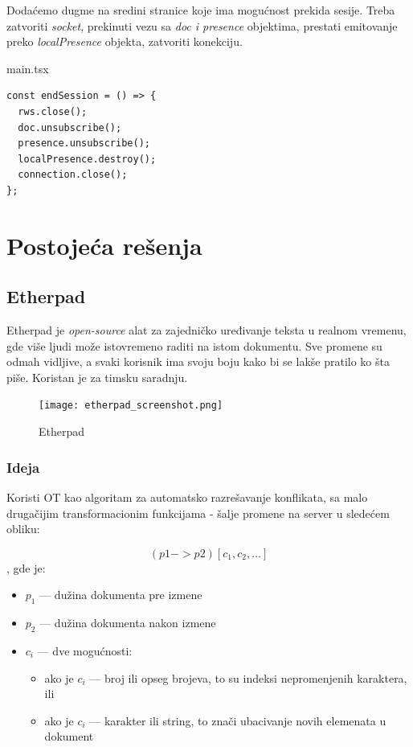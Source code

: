 \documentclass[12pt]{article}
\newcommand{\startnewsection}{
    \clearpage %
    \ifodd\value{page}\else %
        \hbox{} %
        \newpage %
    \fi
}
\begin{document}
Dodaćemo dugme na sredini stranice koje ima mogućnost prekida sesije. Treba zatvoriti \textit{socket}, prekinuti vezu sa \textit{doc i presence} objektima, prestati emitovanje preko \textit{localPresence} objekta, zatvoriti konekciju.

\begin{mylisting}[label={lst:example}]{main.tsx}
\begin{lstlisting}
const endSession = () => {
  rws.close();
  doc.unsubscribe();
  presence.unsubscribe();
  localPresence.destroy();
  connection.close();
};
\end{lstlisting}
\end{mylisting}

\startnewsection

\section{Postojeća rešenja}

\subsection{Etherpad}

Etherpad je \textit{open-source} alat za zajedničko uređivanje teksta u realnom vremenu, gde više ljudi može istovremeno raditi na istom dokumentu. Sve promene su odmah vidljive, a svaki korisnik ima svoju boju kako bi se lakše pratilo ko šta piše. Koristan je za timsku saradnju.\cite{etherpad}

\begin{figure}[H]
	\centering
	\texttt{[image: etherpad\_screenshot.png]}
	\caption{Etherpad}
	
\end{figure}

\subsubsection{Ideja}
Koristi OT kao algoritam za automatsko razrešavanje konflikata, sa malo drugačijim transformacionim funkcijama - šalje promene na server u sledećem obliku:

\[ (p1 -> p2)[c_1, c_2, …] \], gde je:

\begin{itemize}
    \item $p_1$ — dužina dokumenta pre izmene
    \item $p_2$ — dužina dokumenta nakon izmene
    \item $c_i$ — dve mogućnosti:
    \begin{itemize}
        \item ako je $c_i$ — broj ili opseg brojeva, to su indeksi nepromenjenih karaktera, ili
        \item ako je $c_i$ — karakter ili string, to znači ubacivanje novih elemenata u dokument
    \end{itemize}
\end{itemize}
\end{document}
